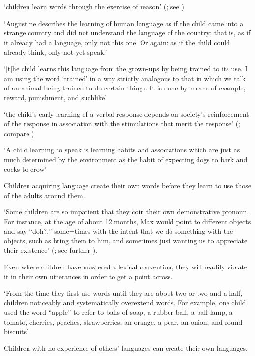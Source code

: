 \documentclass[12pt]{extarticle}
\begin{document}
\begin{multicols}{3}
‘children learn words through the exercise of reason’
(\citealp[p.\ 1103]{Bloom:2001ka}; see \citealp{Bloom:2000qz})
 
‘Augustine describes the learning of human language as if the child came into a strange country and did not understand the language of the country; that is, as if it already had a language, only not this one. Or again: as if the child could already think, only not yet speak.’
\citep[15--16, §32]{Wittgenstein:1953mm}
 
‘[t]he child learns this language from the grown-ups by being trained to its use. I am using the word ‘trained’ in a way strictly analogous to that in which we talk of an animal being trained to do certain things. It is done by means of example, reward, punishment, and suchlike’
\citep[p.\ 77]{Wittgenstein:1972lj}
 
‘the child's early learning of a verbal response depends on society's reinforcement of the response in association with the stimulations that merit the response’
(\citep[p.\ 82]{Quine:1960fe}; compare \citep[pp.\ 28--9]{Quine:1974rd})
 
‘A child learning to speak is learning habits and associations which are just as much determined by the environment as the habit of expecting dogs to bark and cocks to crow’
\citep[p.\ 71]{Russell:1921ww}
 
Children acquiring language create their own words before they learn to use those of the adults around them.
 
‘Some children are so impatient that they coin their own demonstrative pronoun. For instance, at the age of about 12 months, Max would point to different objects and say “doh?,” some¬times with the intent that we do something with the objects, such as bring them to him, and sometimes just wanting us to appreciate their existence’
(\citealp[p.\ 122]{Bloom:2000qz}; see further \citealp{Clark:1981bi,Clark:1982hj}).
 
Even where children have mastered a lexical convention, they will readily violate it in their own utterances in order to get a point across.
 
‘From the time they first use words until they are about two or two-and-a-half, children noticeably and systematically overextend words. For example, one child used the word “apple” to refer to balls of soap, a rubber-ball, a ball-lamp, a tomato, cherries, peaches, strawberries, an orange, a pear, an onion, and round biscuits’
\citep[p.\ 35]{Clark:1993bv}
 
Children with no experience of others' languages can create their own languages.
\citep{Kegl:1999es,Senghas:2001zm,Goldin-Meadow:2003pj}
 

\end{multicols}
\end{document}

